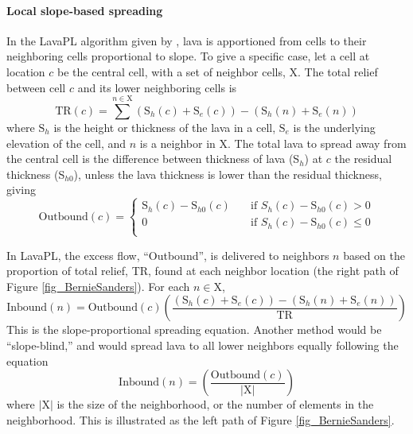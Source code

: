 		\paragraph{Local slope-based spreading} In the LavaPL algorithm given by \citet{connor2012}, lava is apportioned from cells to their neighboring cells proportional to slope. To give a specific case, let a cell at location $c$ be the central cell, with a set of neighbor cells, X. The total relief between cell $c$ and its lower neighboring cells is 
		\begin{equation}
			\text{TR}(c) = \sum^{n\in \text{X}}(\text{S}_h(c)+\text{S}_e(c))-(\text{S}_h(n)+\text{S}_e(n))
			\label{eq_TR}
		\end{equation}
		where $\text{S}_h$ is the height or thickness of the lava in a cell, $\text{S}_e$ is the underlying elevation of the cell, and $n$ is a neighbor in X. The total lava to spread away from the central cell is the difference between thickness of lava (S$_h$) at $c$ the residual thickness (S$_{h0}$), unless the lava thickness is lower than the residual thickness, giving
		\begin{equation}
		 \text{Outbound}(c) =
			\begin{cases}
			\text{S}_h(c)-\text{S}_{h0}(c) & \quad \text{if } {S}_h(c)-\text{S}_{h0}(c) > 0\\
			0 & \quad \text{if } {S}_h(c)-\text{S}_{h0}(c) \le 0\\
			\end{cases}
			\label{eq_excess}
		\end{equation}
		
		In LavaPL, the excess flow, ``Outbound'', is delivered to neighbors $n$ based on the proportion of total relief, TR, found at each neighbor location (the right path of Figure \ref{fig_BernieSanders}). For each $n\in$X,
		\begin{equation}
			\text{Inbound}(n) = \text{Outbound}(c)\left(\frac{(\text{S}_h(c)+\text{S}_e(c))-(\text{S}_h(n)+\text{S}_e(n))}{\text{TR}}\right)
			\label{eq_propshare}
		\end{equation}
		This is the slope-proportional spreading equation. Another method would be ``slope-blind,'' and would spread lava to all lower neighbors equally following the equation
		\begin{equation}
			\text{Inbound}(n) = \left(\frac{\text{Outbound}(c)}{|\text{X}|}\right)
			\label{eq_equalshare}
		\end{equation}
		where $|\text{X}|$ is the size of the neighborhood, or the number of elements in the neighborhood. This is illustrated as the left path of Figure \ref{fig_BernieSanders}.
		
